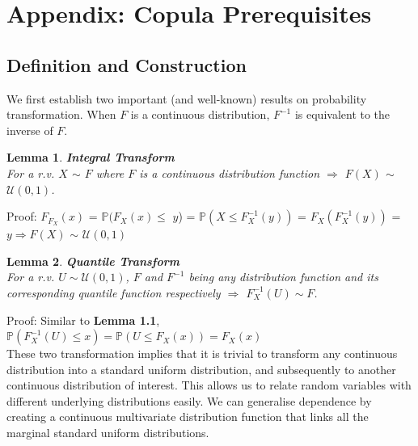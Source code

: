 \documentclass[12pt]{report}
\newtheorem{lemma}{Lemma}[subsection]
\newcommand{\1}{\mathbf{1}}
\begin{document}
\medskip

\printbibliography

\newpage
\appendix 
\renewcommand{\thechapter}{A\arabic{chapter}}



\section{Appendix: Copula Prerequisites}
\vspace{0.5cm}
\subsection{Definition and Construction}
\vspace{0.5cm}

We first establish two important (and well-known) results on probability transformation. When $F$ is a continuous distribution, $F^{-1}$ is equivalent to the inverse of $F$.\\


\begin{lemma}\label{IntegralTransform} 
\textbf{Integral Transform} \\

For a r.v. $X$ $\sim$ $F$ where $F$ is a continuous distribution function $\Rightarrow$ $F(X)$ $\sim$ $\mathcal{U}(0,1)$.
\end{lemma}
Proof:  \parencite{HofertBook} $F_{F_{X}}(x)$ = $\mathbb{P}(F_{X}(x) $$\le$ $y$) = $\mathbb{P}(X \le F^{-1}_{X}(y))$ = $F_{X}(F^{-1}_{X}(y))$ = $y \Rightarrow F(X)$ $\sim$ $\mathcal{U}(0,1)$ 
\\


\begin{lemma}\label{QuantileTransform}
\textbf{Quantile Transform} \\

For a r.v. $U \sim \mathcal{U}(0,1)$, $F$ and $F^{-1}$ being any distribution function and its corresponding quantile function respectively $\Rightarrow$ $F^{-1}_{X}(U) \sim F $.
\end{lemma}
Proof: Similar to \textbf{Lemma 1.1}, $\mathbb{P}(F^{-1}_{X}(U) \le x) = \mathbb{P}(U \le F_{X}(x)) = F_{X}(x)$
\\

\vspace{0.5cm}
These two transformation implies that it is trivial to transform any continuous distribution into a standard uniform distribution, and subsequently to another continuous distribution of interest. This allows us to relate random variables with different underlying distributions easily. We can generalise dependence by creating a continuous multivariate distribution function that links all the marginal standard uniform distributions. 
\end{document}

